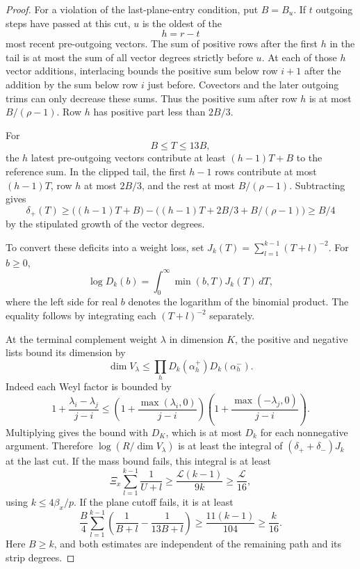 \begin{proof}
For a violation of the last-plane-entry condition, put \(B=B_u\).
If \(t\) outgoing steps have passed at this cut, \(u\) is the
oldest of the
\[
 h=r-t
\]
most recent pre-outgoing vectors.
The sum of positive rows after the first \(h\) in the tail is
at most the sum of all vector degrees strictly before \(u\).
At each of those \(h\) vector additions, interlacing bounds the
positive sum below row \(i+1\) after the addition by the sum
below row \(i\) just before. Covectors and the later outgoing
trims can only decrease these sums. Thus the positive sum after
row \(h\) is at most \(B/(\rho-1)\). Row \(h\) has positive part
less than \(2B/3\).

For
\[
 B\le T\le13B,
\]
the \(h\) latest pre-outgoing
vectors contribute at least \((h-1)T+B\) to the reference sum.
In the clipped tail, the first \(h-1\) rows contribute at
most \((h-1)T\), row \(h\) at most \(2B/3\), and the rest at
most \(B/(\rho-1)\). Subtracting gives
\[
 \delta_+(T)\ge \big((h-1)T+B\big)
                 -\big((h-1)T+2B/3+B/(\rho-1)\big)\ge B/4
\]
by the stipulated growth of the vector degrees.

To convert these deficits into a weight loss, set
\(J_k(T)=\sum_{l=1}^{k-1}(T+l)^{-2}\). For \(b\ge0\),
\[
 \log D_k(b)=\int_0^\infty\min(b,T)J_k(T)\,dT,
\]
where the left side for real \(b\) denotes the logarithm of the
binomial product. The equality follows by integrating each
\((T+l)^{-2}\) separately.

At the terminal complement weight
\(\lambda\) in dimension \(K\), the positive and negative lists
bound its dimension by
\[
 \dim V_\lambda\le\prod_h D_k(\alpha_h^+)D_k(\alpha_h^-).
\]
Indeed each Weyl factor is bounded by
\[
 1+\frac{\lambda_i-\lambda_j}{j-i}
 \le\left(1+\frac{\max(\lambda_i,0)}{j-i}\right)
     \left(1+\frac{\max(-\lambda_j,0)}{j-i}\right).
\]
Multiplying gives the bound with \(D_K\), which is at most
\(D_k\) for each nonnegative argument. Therefore
\(\log(R/\dim V_\lambda)\) is at least the integral of
\((\delta_++\delta_-)J_k\) at the last cut. If the mass bound
fails, this integral is at least
\[
 \Xi_x\sum_{l=1}^{k-1}\frac1{U+l}
 \ge \frac{\mathcal L(k-1)}{9k}\ge\frac{\mathcal L}{16},
\]
using \(k\le4\beta_x/p\). If the plane cutoff fails, it is at
least
\[
 \frac B4\sum_{l=1}^{k-1}
     \left(\frac1{B+l}-\frac1{13B+l}\right)
 \ge\frac{11(k-1)}{104}\ge\frac{k}{16}.
\]
Here \(B\ge k\), and both estimates are independent of the
remaining path and its strip degrees.


\end{proof}
